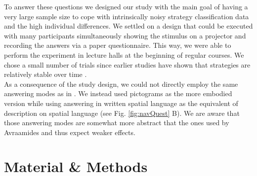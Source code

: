 \documentclass{frontiersSCNS} %
\begin{document}
To answer these questions we designed our study with the main goal of having a very large sample size to cope with intrinsically noisy strategy classification data and the high individual differences. We settled on a design that could be executed with many participants simultaneously showing the stimulus on a projector and recording the answers via a paper questionnaire. This way, we were able to perform the experiment in lecture halls at the beginning of regular courses. We chose a small number of trials since earlier studies have shown that strategies are relatively stable over time \citep{Goeke2013}.\\
As a consequence of the study design, we could not directly employ the same answering modes as in \cite{Avraamides2004}. We instead used pictograms as the more embodied version while using answering in written spatial language as the equivalent of description on spatial language (see Fig. \ref{fig:navQuest} B). We are aware that those answering modes are somewhat more abstract that the ones used by Avraamides and thus expect weaker effects.


\section{Material \& Methods}
\end{document}
